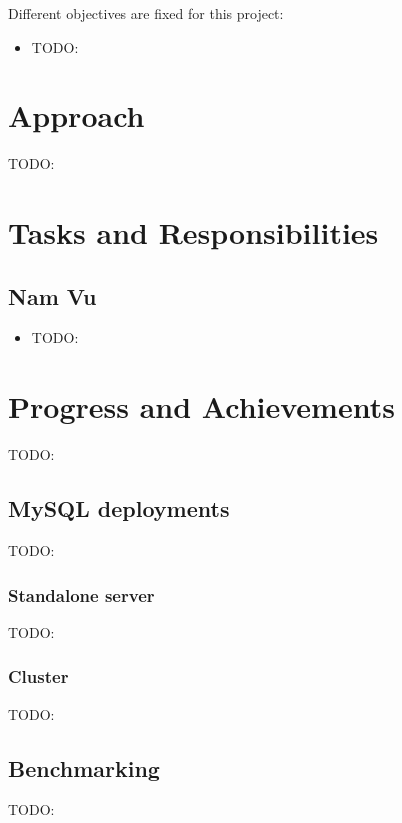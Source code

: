 \documentclass[letterpaper,headings=standardclasses,parskip=half]{scrartcl}
\begin{document}
Different objectives are fixed for this project:

\begin{itemize}
    \item TODO:
\end{itemize}

\section{Approach}

TODO:

\section{Tasks and Responsibilities}

\subsection*{Nam Vu}

\begin{itemize}
    \item TODO:
\end{itemize}

\section{Progress and Achievements}

TODO:

\subsection{MySQL deployments}

TODO:

\subsubsection{Standalone server}

TODO:

\subsubsection{Cluster}

TODO:

\subsection{Benchmarking}

TODO:
\end{document}

